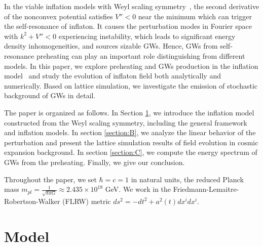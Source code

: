 \documentclass[12pt, a4paper]{article}
\begin{document}
In the viable inflation models with Weyl scaling symmetry~\cite{Wang:2022ojc, Wang:2023hsb}, the second derivative of the nonconvex potential satisfies $V''<0$ near the minimum which can trigger the self-resonance of inflaton. It causes the perturbation modes in Fourier space with $k^2+V''<0$ experiencing instability, which leads to significant energy density inhomogeneities, and sources sizable GWs. Hence, GWs from self-resonance preheating can play an important role distinguishing from different models. In this paper, we explore preheating and GWs production in the inflation model~\cite{Wang:2023hsb} and study the evolution of inflaton field both analytically and numerically. Based on lattice simulation, we investigate the emission of stochastic background of GWs in detail.

The paper is organized as follows. In Section \ref{section:A}, we introduce the inflation model constructed from the Weyl scaling symmetry, including the general framework and inflation models. In section \ref{section:B}, we analyze the linear behavior of the perturbation and present the lattice simulation results of field evolution in cosmic expansion background. In section \ref{section:C}, we compute the energy spectrum of GWs from the preheating. Finally, we give our conclusion.

Throughout the paper, we set $\hbar=c=1$ in natural units, the reduced Planck mass $m_{pl}=\frac{1}{\sqrt{8\pi G}}\approx 2.435\times 10^{18}$ GeV.
We work in the Friedmann-Lemaitre-Robertson-Walker (FLRW) metric $ds^2=-dt^2+a^2\left(t\right)dx^idx^i$.

\section{Model}
\label{section:A}
\end{document}
